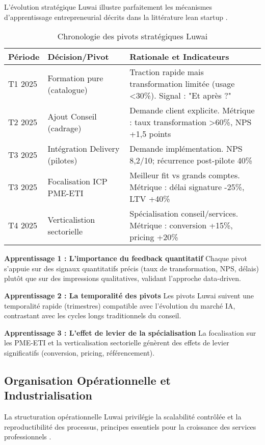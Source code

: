 L'évolution stratégique Luwai illustre parfaitement les mécanismes d'apprentissage entrepreneurial décrits dans la littérature lean startup \cite{ries2011lean}.

\begin{table}[ht]
\centering
\caption{Chronologie des pivots stratégiques Luwai}
\label{tab:luwai_pivots}
\begin{tabular}{@{}p{3cm}p{6cm}p{6cm}@{}}
\toprule
\textbf{Période} & \textbf{Décision/Pivot} & \textbf{Rationale et Indicateurs} \\
\midrule
T1 2025 & Formation pure (catalogue) & Traction rapide mais transformation limitée (usage <30\%). Signal : "Et après ?" \\
T2 2025 & Ajout Conseil (cadrage) & Demande client explicite. Métrique : taux transformation >60\%, NPS +1,5 points \\
T3 2025 & Intégration Delivery (pilotes) & Demande implémentation. NPS 8,2/10; récurrence post-pilote 40\% \\
T3 2025 & Focalisation ICP PME-ETI & Meilleur fit vs grands comptes. Métrique : délai signature -25\%, LTV +40\% \\
T4 2025 & Verticalistion sectorielle & Spécialisation conseil/services. Métrique : conversion +15\%, pricing +20\% \\
\bottomrule
\end{tabular}
\end{table}

\textbf{Apprentissage 1 : L'importance du feedback quantitatif}
Chaque pivot s'appuie sur des signaux quantitatifs précis (taux de transformation, NPS, délais) plutôt que sur des impressions qualitatives, validant l'approche data-driven.

\textbf{Apprentissage 2 : La temporalité des pivots}
Les pivots Luwai suivent une temporalité rapide (trimestres) compatible avec l'évolution du marché IA, contrastant avec les cycles longs traditionnels du conseil.

\textbf{Apprentissage 3 : L'effet de levier de la spécialisation}
La focalisation sur les PME-ETI et la verticalisation sectorielle génèrent des effets de levier significatifs (conversion, pricing, référencement).

\subsection{Organisation Opérationnelle et Industrialisation}

La structuration opérationnelle Luwai privilégie la scalabilité contrôlée et la reproductibilité des processus, principes essentiels pour la croissance des services professionnels \cite{maister2012managing}.

